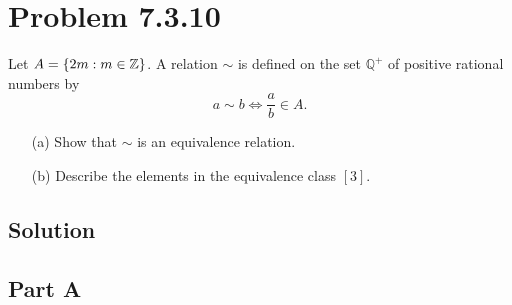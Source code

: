 \documentclass[12pt]{extarticle}
\begin{document}
\section*{Problem 7.3.10}
Let $A = \qty{2m : m \in \mathbb{Z}}$. A relation $\sim$ is defined on the set $\mathbb{Q}^+$ of positive rational numbers by
\[
	a \sim b \Longleftrightarrow \frac{a}{b} \in A
.\]
\begin{enumerate}
	\item[(a)] Show that $\sim$ is an equivalence relation.
	\item[(b)] Describe the elements in the equivalence class $[3]$.
\end{enumerate}

\subsection*{Solution}
\subsection*{Part A}
\end{document}
